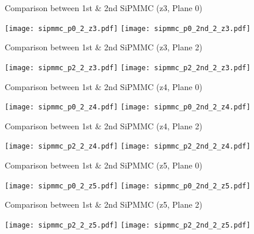 \documentclass{beamer}
\begin{document}
\begin{frame}{Comparison between 1st \& 2nd SiPMMC (z3, Plane 0)}
\begin{adjustwidth}{-1.5em}{-1.5em}
	\texttt{[image: sipmmc\_p0\_2\_z3.pdf]}
	\texttt{[image: sipmmc\_p0\_2nd\_2\_z3.pdf]}
\end{adjustwidth}
\end{frame}

\begin{frame}{Comparison between 1st \& 2nd SiPMMC (z3, Plane 2)}
\begin{adjustwidth}{-1.5em}{-1.5em}
	\texttt{[image: sipmmc\_p2\_2\_z3.pdf]}
	\texttt{[image: sipmmc\_p2\_2nd\_2\_z3.pdf]}
\end{adjustwidth}
\end{frame}

\begin{frame}{Comparison between 1st \& 2nd SiPMMC (z4, Plane 0)}
\begin{adjustwidth}{-1.5em}{-1.5em}
	\texttt{[image: sipmmc\_p0\_2\_z4.pdf]}
	\texttt{[image: sipmmc\_p0\_2nd\_2\_z4.pdf]}
\end{adjustwidth}
\end{frame}

\begin{frame}{Comparison between 1st \& 2nd SiPMMC (z4, Plane 2)}
\begin{adjustwidth}{-1.5em}{-1.5em}
	\texttt{[image: sipmmc\_p2\_2\_z4.pdf]}
	\texttt{[image: sipmmc\_p2\_2nd\_2\_z4.pdf]}
\end{adjustwidth}
\end{frame}

\begin{frame}{Comparison between 1st \& 2nd SiPMMC (z5, Plane 0)}
\begin{adjustwidth}{-1.5em}{-1.5em}
	\texttt{[image: sipmmc\_p0\_2\_z5.pdf]}
	\texttt{[image: sipmmc\_p0\_2nd\_2\_z5.pdf]}
\end{adjustwidth}
\end{frame}

\begin{frame}{Comparison between 1st \& 2nd SiPMMC (z5, Plane 2)}
\begin{adjustwidth}{-1.5em}{-1.5em}
	\texttt{[image: sipmmc\_p2\_2\_z5.pdf]}
	\texttt{[image: sipmmc\_p2\_2nd\_2\_z5.pdf]}
\end{adjustwidth}
\end{frame}
\end{document}
